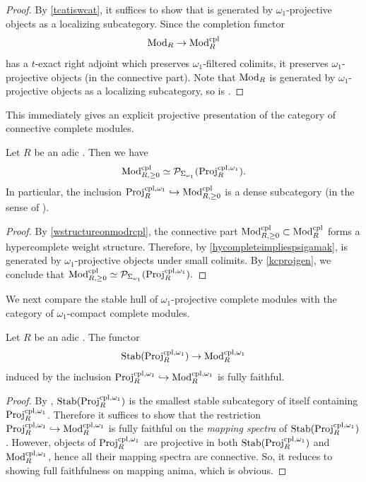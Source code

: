 \documentclass[a4paper,10pt, oneside]{amsart}
\begin{document}
	\begin{proof}
		By \cref{tcatiswcat}, it suffices to show that \modrcpl is generated by $\omega_1$-projective objects as a localizing subcategory. Since the completion functor $$\operatorname{Mod}_R\to \mathrm{Mod}_{R}^{\mathrm{cpl}}$$ has a $t$-exact right adjoint which preserves $\omega_1$-filtered colimits, it preserves $\omega_1$-projective objects (in the connective part). Note that $\operatorname{Mod}_R$ is generated by $\omega_1$-projective objects as a localizing subcategory, so is \modrcpl.
		
	\end{proof}
	This immediately gives an explicit projective presentation of the  category of connective complete modules.
	\begin{cor}\label{modrcplomega1projgen}
		Let $R$ be an adic \einfring. Then we have $$\mathrm{Mod}_{R,\geq 0}^{\mathrm{cpl}}\simeq \mathcal{P}_{\Sigma_{\omega_1}}(\mathrm{Proj}_R^{\mathrm{cpl},\omega_1}).$$ In particular, the inclusion $\mathrm{Proj}_R^{\mathrm{cpl},\omega_1}\hookrightarrow \mathrm{Mod}_{R,\geq 0}^{\mathrm{cpl}}$ is a dense subcategory (in the sense of \cite[Definition 20.4.1.1]{sag}).
	\end{cor}
	\begin{proof}
		By \cref{wstructureonmodrcpl}, the connective part $\mathrm{Mod}_{R,\geq 0}^{\mathrm{cpl}}\subset \mathrm{Mod}_{R}^{\mathrm{cpl}}$ forms a hypercomplete weight structure. Therefore, by	\cref{hycompleteimpliespsigamak}, \modrcplgeq is generated by $\omega_1$-projective objects under small colimits. By \cref{kcprojgen}, we conclude that $\mathrm{Mod}_{R,\geq 0}^{\mathrm{cpl}}\simeq \mathcal{P}_{\Sigma_{\omega_1}}(\mathrm{Proj}_R^{\mathrm{cpl},\omega_1}).$
	\end{proof}
	We next compare the stable hull of $\omega_1$-projective complete modules with the category of $\omega_1$-compact complete modules.
	\begin{lem}
		Let $R$ be an adic \einfring.	The functor $$\mathrm{Stab}(\mathrm{Proj}_R^{\mathrm{cpl},\omega_1})\to \operatorname{Mod}_R^{\mathrm{cpl},\omega_1}$$ induced by the inclusion $\mathrm{Proj}_R^{\mathrm{cpl},\omega_1}\hookrightarrow\operatorname{Mod}_R^{\mathrm{cpl},\omega_1}$ is fully faithful. 
	\end{lem}
	\begin{proof}
		By \cite[Lemma 6.6]{winges2024localisation}, $\mathrm{Stab}(\mathrm{Proj}_R^{\mathrm{cpl},\omega_1})$ is the smallest stable subcategory of itself containing $\mathrm{Proj}_R^{\mathrm{cpl},\omega_1}$. Therefore it suffices to show that the restriction $\mathrm{Proj}_R^{\mathrm{cpl},\omega_1}\hookrightarrow\operatorname{Mod}_R^{\mathrm{cpl},\omega_1}$ is fully faithful on the \emph{mapping spectra} of $\mathrm{Stab}(\mathrm{Proj}_R^{\mathrm{cpl},\omega_1})$. However,  objects of $\mathrm{Proj}_R^{\mathrm{cpl},\omega_1}$ are projective in both $\mathrm{Stab}(\mathrm{Proj}_R^{\mathrm{cpl},\omega_1})$ and $\operatorname{Mod}_R^{\mathrm{cpl},\omega_1}$, hence all their mapping spectra are connective. So, it reduces to showing full faithfulness on mapping anima, which is obvious.
	\end{proof}
\end{document}
